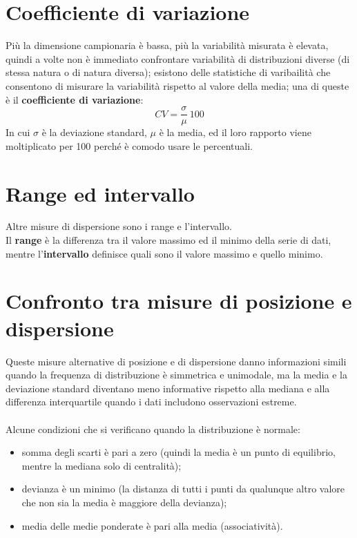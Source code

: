 \documentclass[10pt, draft]{book}
\newcommand{\tightlist}{%
\setlength{\itemsep}{1pt}\setlength{\parskip}{0pt}\setlength{\parsep}{0pt}}
\begin{document}
\section{Coefficiente di variazione}
Più la dimensione campionaria è bassa, più la variabilità misurata è elevata, quindi a volte non è immediato confrontare variabilità di distribuzioni diverse (di stessa natura o di natura diversa); esistono delle statistiche di varibailità che consentono di misurare la variabilità rispetto al valore della media; una di queste è il \textbf{coefficiente di variazione}:
\begin{equation}
    CV = \frac{\sigma}{\mu}\ 100
\end{equation}
In cui $\sigma$ è la deviazione standard, $\mu$ è la media, ed il loro rapporto viene moltiplicato per 100 perché è comodo usare le percentuali.

\section{Range ed intervallo}
Altre misure di dispersione sono i range e l'intervallo.
\\
Il \textbf{range} è la differenza tra il valore massimo ed il minimo della serie di dati, mentre l'\textbf{intervallo} definisce quali sono il valore massimo e quello minimo.

\section{Confronto tra misure di posizione e dispersione}
Queste misure alternative di posizione e di dispersione danno informazioni simili quando la frequenza di distribuzione è simmetrica e unimodale, ma la media e la deviazione standard diventano meno informative rispetto alla mediana e alla differenza interquartile quando i dati includono osservazioni estreme.
\\
\\
Alcune condizioni che si verificano quando la distribuzione è normale:
\begin{itemize} \tightlist
    \item somma degli scarti è pari a zero (quindi la media è un punto di equilibrio, mentre la mediana solo di centralità);
    \item devianza è un minimo (la distanza di tutti i punti da qualunque altro valore che non sia la media è maggiore della devianza);
    \item media delle medie ponderate è pari alla media (associatività).
\end{itemize}
\end{document}
